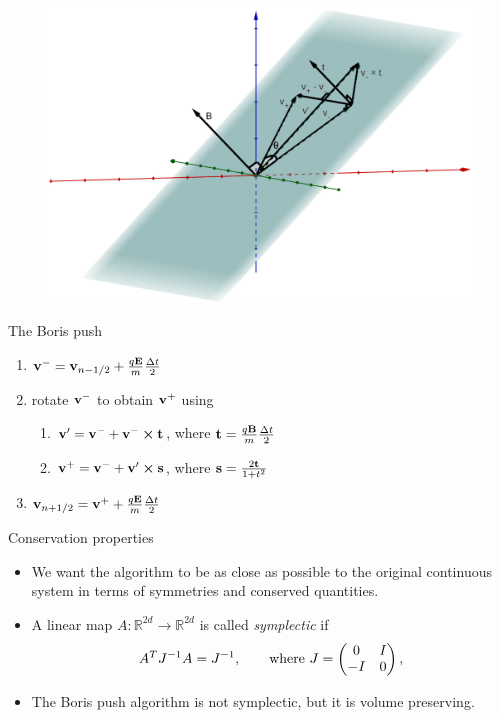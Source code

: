\documentclass{beamer}
\begin{document}
\begin{frame}
	\begin{figure}
		\includegraphics[width=\textwidth]{Boris-rotation-3D}
	\end{figure}
\end{frame}

\begin{frame}{The Boris push}
	\begin{enumerate}
	  \item \(\vb{v}^- = \vb{v}_{n-1/2} + \frac{q \vb{E}}{m} \frac{\Delta t}{2}\)
	  \item rotate \(\vb{v}^-\) to obtain \(\vb{v}^+\) using
	  \begin{enumerate}
	    \item \(\vb{v}' = \vb{v}^- + \vb{v}^- \cp \vb{t}\), where \(\vb{t} = \frac{q \vb{B}}{m} \frac{\Delta t}{2}\)
	    \item \(\vb{v}^+ = \vb{v}^- + \vb{v}' \cp \vb{s}\), where \(\vb{s} = \frac{2 \vb{t}}{1+t^2}\)
	  \end{enumerate}
	  \item \(\vb{v}_{n+1/2} = \vb{v}^+ + \frac{q \vb{E}}{m} \frac{\Delta t}{2}\)
	\end{enumerate}
\end{frame}

\begin{frame}{Conservation properties}
	\begin{itemize}
		\item We want the algorithm to be as close as possible to
		the original continuous system in terms of symmetries and conserved
		quantities.
		\item A linear map \(A: \mathbb{R}^{2d} \to \mathbb{R}^{2d}\) is called
  		\emph{symplectic} if
		  \[
		  A^T J^{-1} A = J^{-1},\qquad \text{where} \ J = \mqty(0 & I \\ -I & 0)\,,
		  \]
		\item The Boris push algorithm is not symplectic, but it is volume preserving.
	\end{itemize}
\end{frame}
\end{document}
